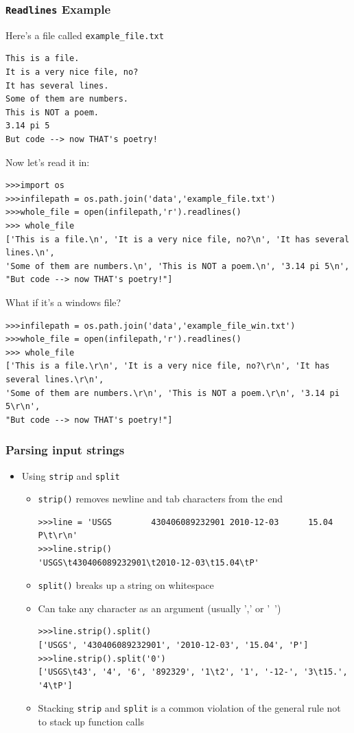 \documentclass{beamer}
\begin{document}
\begin{frame}[fragile]
\frametitle{\texttt{Readlines} Example}
\begin{tiny}
Here's a file called \texttt{example\_file.txt}
\begin{verbatim}
This is a file.
It is a very nice file, no?
It has several lines.
Some of them are numbers.
This is NOT a poem.
3.14 pi 5
But code --> now THAT's poetry!
\end{verbatim}

\pause
Now let's read it in:
\begin{lstlisting}
>>>import os
>>>infilepath = os.path.join('data','example_file.txt')
>>>whole_file = open(infilepath,'r').readlines()
>>> whole_file
['This is a file.\n', 'It is a very nice file, no?\n', 'It has several lines.\n', 
'Some of them are numbers.\n', 'This is NOT a poem.\n', '3.14 pi 5\n',
"But code --> now THAT's poetry!"]
\end{lstlisting}
\pause
What if it's a windows file?
\begin{lstlisting}
>>>infilepath = os.path.join('data','example_file_win.txt')
>>>whole_file = open(infilepath,'r').readlines()
>>> whole_file
['This is a file.\r\n', 'It is a very nice file, no?\r\n', 'It has several lines.\r\n', 
'Some of them are numbers.\r\n', 'This is NOT a poem.\r\n', '3.14 pi 5\r\n',
"But code --> now THAT's poetry!"]
\end{lstlisting}
\end{tiny}



\end{frame}

\begin{frame}[fragile]
\frametitle{Parsing input strings}
\begin{itemize}
\item Using \texttt{strip} and \texttt{split}
\begin{itemize} 
\item \texttt{strip()} removes newline and tab characters from the end 

\begin{lstlisting}
>>>line = 'USGS        430406089232901 2010-12-03      15.04   P\t\r\n'
>>>line.strip()
'USGS\t430406089232901\t2010-12-03\t15.04\tP'
\end{lstlisting}
\end{itemize}
\pause
\begin{itemize} 
\item \texttt{split()} breaks up a string on whitespace 
\item Can take any character as an argument (usually ',' or '~') 
\begin{lstlisting}
>>>line.strip().split()
['USGS', '430406089232901', '2010-12-03', '15.04', 'P']
>>>line.strip().split('0')
['USGS\t43', '4', '6', '892329', '1\t2', '1', '-12-', '3\t15.', '4\tP']
\end{lstlisting}
\pause
\item Stacking \texttt{strip} and \texttt{split} is a common violation of the general rule not to stack up function calls
\end{itemize}
\end{itemize}
\end{frame}
\end{document}
